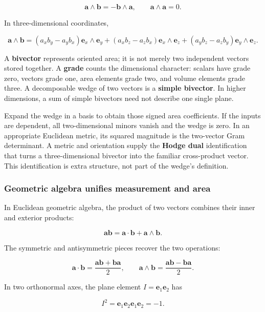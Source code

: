 \[
\mathbf a\wedge\mathbf b=-\mathbf b\wedge\mathbf a,
\qquad \mathbf a\wedge\mathbf a=0.
\]

In three-dimensional coordinates,

\[
\mathbf a\wedge\mathbf b
=(a_xb_y-a_yb_x)\mathbf e_x\wedge\mathbf e_y
+(a_xb_z-a_zb_x)\mathbf e_x\wedge\mathbf e_z
+(a_yb_z-a_zb_y)\mathbf e_y\wedge\mathbf e_z.
\]

A \textbf{bivector} represents oriented area; it is not merely two independent vectors stored together. A \textbf{grade} counts the dimensional character: scalars have grade zero, vectors grade one, area elements grade two, and volume elements grade three. A decomposable wedge of two vectors is a \textbf{simple bivector}. In higher dimensions, a sum of simple bivectors need not describe one single plane.

Expand the wedge in a basis to obtain those signed area coefficients. If the inputs are dependent, all two-dimensional minors vanish and the wedge is zero. In an appropriate Euclidean metric, its squared magnitude is the two-vector Gram determinant. A metric and orientation supply the \textbf{Hodge dual} identification that turns a three-dimensional bivector into the familiar cross-product vector. This identification is extra structure, not part of the wedge's definition.

\subsubsection{Geometric algebra unifies measurement and area}\label{01-foundations-i-ch018-geometric-algebra-unifies-measurement-and-area}

\hypertarget{01-foundations-i-ch018-geometric-algebra-unifies-measurement-and-area}{}

In Euclidean geometric algebra, the product of two vectors combines their inner and exterior products:

\[
\mathbf a\mathbf b=\mathbf a\cdot\mathbf b+\mathbf a\wedge\mathbf b.
\]

The symmetric and antisymmetric pieces recover the two operations:

\[
\mathbf a\cdot\mathbf b=\frac{\mathbf a\mathbf b+\mathbf b\mathbf a}{2},\qquad
\mathbf a\wedge\mathbf b=\frac{\mathbf a\mathbf b-\mathbf b\mathbf a}{2}.
\]

In two orthonormal axes, the plane element \(I=\mathbf e_1\mathbf e_2\) has

\[
I^2=\mathbf e_1\mathbf e_2\mathbf e_1\mathbf e_2=-1.
\]

